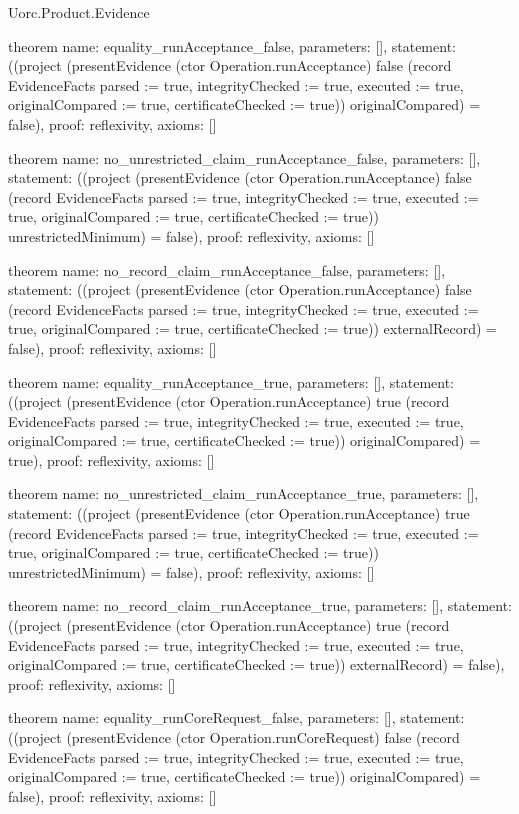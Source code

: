 \begin{lexlean}{Uorc.Product.Evidence}
\begin{semanticmodule}
theorem{
  name: equality_runAcceptance_false,
  parameters: [],
  statement: ((project (presentEvidence (ctor Operation.runAcceptance) false (record EvidenceFacts {parsed := true, integrityChecked := true, executed := true, originalCompared := true, certificateChecked := true})) originalCompared) = false),
  proof: reflexivity{},
  axioms: []
}

theorem{
  name: no_unrestricted_claim_runAcceptance_false,
  parameters: [],
  statement: ((project (presentEvidence (ctor Operation.runAcceptance) false (record EvidenceFacts {parsed := true, integrityChecked := true, executed := true, originalCompared := true, certificateChecked := true})) unrestrictedMinimum) = false),
  proof: reflexivity{},
  axioms: []
}

theorem{
  name: no_record_claim_runAcceptance_false,
  parameters: [],
  statement: ((project (presentEvidence (ctor Operation.runAcceptance) false (record EvidenceFacts {parsed := true, integrityChecked := true, executed := true, originalCompared := true, certificateChecked := true})) externalRecord) = false),
  proof: reflexivity{},
  axioms: []
}

theorem{
  name: equality_runAcceptance_true,
  parameters: [],
  statement: ((project (presentEvidence (ctor Operation.runAcceptance) true (record EvidenceFacts {parsed := true, integrityChecked := true, executed := true, originalCompared := true, certificateChecked := true})) originalCompared) = true),
  proof: reflexivity{},
  axioms: []
}

theorem{
  name: no_unrestricted_claim_runAcceptance_true,
  parameters: [],
  statement: ((project (presentEvidence (ctor Operation.runAcceptance) true (record EvidenceFacts {parsed := true, integrityChecked := true, executed := true, originalCompared := true, certificateChecked := true})) unrestrictedMinimum) = false),
  proof: reflexivity{},
  axioms: []
}

theorem{
  name: no_record_claim_runAcceptance_true,
  parameters: [],
  statement: ((project (presentEvidence (ctor Operation.runAcceptance) true (record EvidenceFacts {parsed := true, integrityChecked := true, executed := true, originalCompared := true, certificateChecked := true})) externalRecord) = false),
  proof: reflexivity{},
  axioms: []
}

theorem{
  name: equality_runCoreRequest_false,
  parameters: [],
  statement: ((project (presentEvidence (ctor Operation.runCoreRequest) false (record EvidenceFacts {parsed := true, integrityChecked := true, executed := true, originalCompared := true, certificateChecked := true})) originalCompared) = false),
  proof: reflexivity{},
  axioms: []
}


\end{semanticmodule}
\end{lexlean}
